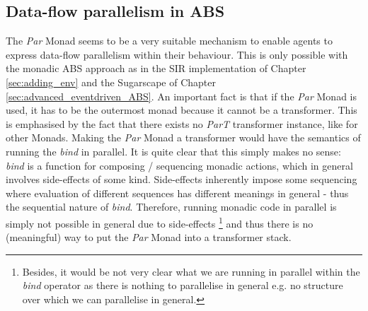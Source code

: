 \subsection{Data-flow parallelism in ABS}
The \textit{Par} Monad seems to be a very suitable mechanism to enable agents to express data-flow parallelism within their behaviour. This is only possible with the monadic ABS approach as in the SIR implementation of Chapter \ref{sec:adding_env} and the Sugarscape of Chapter \ref{sec:advanced_eventdriven_ABS}. An important fact is that if the \textit{Par} Monad is used, it has to be the outermost monad because it cannot be a transformer. This is emphasised by the fact that there exists no \textit{ParT} transformer instance, like for other Monads. Making the \textit{Par} Monad a transformer would have the semantics of running the \textit{bind} in parallel. It is quite clear that this simply makes no sense: \textit{bind} is a function for composing / sequencing monadic actions, which in general involves side-effects of some kind. Side-effects inherently impose some sequencing where evaluation of different sequences has different meanings in general - thus the sequential nature of \textit{bind}. Therefore, running monadic code in parallel is simply not possible in general due to side-effects \footnote{Besides, it would be not very clear what we are running in parallel within the \textit{bind} operator as there is nothing to parallelise in general e.g. no structure over which we can parallelise in general.} and thus there is no (meaningful) way to put the \textit{Par} Monad into a transformer stack.